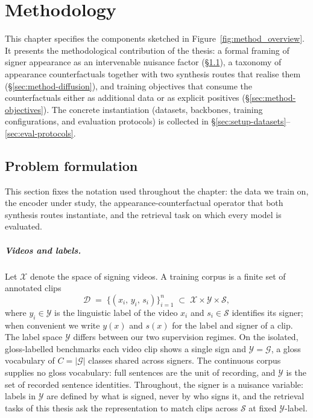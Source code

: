 \chapter{Methodology}
\label{chap:method}
This chapter specifies the components sketched in
Figure~\ref{fig:method_overview}. It presents the methodological
contribution of the thesis: a
formal framing of signer appearance as an intervenable nuisance factor
(\S\ref{sec:method-notation}), a taxonomy of appearance counterfactuals
together with two synthesis routes that realise them
(\S\ref{sec:method-diffusion}), and training objectives that consume the
counterfactuals either as additional data or as explicit positives
(\S\ref{sec:method-objectives}). The concrete instantiation (datasets,
backbones, training configurations, and evaluation protocols) is
collected in \S\ref{sec:setup-datasets}--\ref{sec:eval-protocols}.

\section{Problem formulation}
\label{sec:method-notation}
This section fixes the notation used throughout the chapter: the data we
train on, the encoder under study, the appearance-counterfactual operator
that both synthesis routes instantiate, and the retrieval task on which
every model is evaluated.

\paragraph{Videos and labels.}
Let $\mathcal{X}$ denote the space of signing videos. A training corpus is
a finite set of annotated clips
\begin{equation}
\label{eq:dataset}
\mathcal{D} \;=\; \bigl\{(x_i,\, y_i,\, s_i)\bigr\}_{i=1}^{n}
\;\subset\; \mathcal{X} \times \mathcal{Y} \times \mathcal{S},
\end{equation}
where $y_i \in \mathcal{Y}$ is the linguistic label of the video $x_i$ and
$s_i \in \mathcal{S}$ identifies its signer; when convenient we write
$y(x)$ and $s(x)$ for the label and signer of a clip. The label space
$\mathcal{Y}$ differs between our two supervision regimes. On the isolated,
gloss-labelled benchmarks each video clip shows a single sign and
$\mathcal{Y} = \mathcal{G}$, a gloss vocabulary of $C = |\mathcal{G}|$
classes shared across signers. The continuous corpus supplies no gloss
vocabulary: full sentences are the unit of recording, and $\mathcal{Y}$ is
the set of recorded sentence identities. Throughout, the signer is a
nuisance variable: labels in $\mathcal{Y}$ are defined by what is signed,
never by who signs it, and the retrieval tasks of this thesis ask the
representation to match clips across $\mathcal{S}$ at fixed
$\mathcal{Y}$-label.

